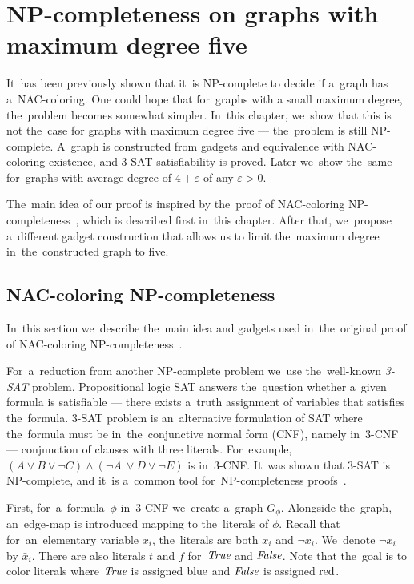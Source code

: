\chapter{NP-completeness on graphs with maximum degree five}%
\label{chapter:np}

\begin{chapterabstract}

	It~has been previously shown that it~is NP-complete to decide
	if a~graph has a~NAC-coloring.
	One could hope that for~graphs with a small maximum degree,
	the~problem becomes somewhat simpler.
	In~this chapter, we~show that this is not the~case
	for graphs with maximum degree five --- the~problem is still NP-complete.
	A~graph is constructed from gadgets and equivalence
	with NAC-coloring existence, and 3-SAT satisfiability is proved.
	Later we~show the~same for~graphs with average degree of
	$4+\varepsilon$ of any $\varepsilon > 0$.

\end{chapterabstract}

The~main idea of our proof is inspired by
the~proof of NAC-coloring NP-completeness~\cite{np_complete},
which is described first in~this chapter.
After that, we~propose a~different gadget construction
that allows us to limit the~maximum
degree in~the~constructed graph to five.

\section{NAC-coloring NP-completeness}

In~this section we~describe the~main idea and gadgets used
in~the~original proof of NAC-coloring NP-completeness~\cite{np_complete}.

For~a~reduction from another NP-complete problem
we~use the~well-known \emph{3-SAT} problem.
Propositional logic SAT answers the~question
whether a~given formula is satisfiable ---
there exists a~truth assignment of variables that satisfies the~formula.
3-SAT problem is an~alternative formulation of SAT
where the~formula must be in~the~conjunctive normal form (CNF), namely in~3-CNF
--- conjunction of clauses with three literals.
For~example, \( (A \lor B \lor \lnot C) \land (\lnot A~\lor D \lor \lnot E) \)
is in~3-CNF\@.
It~was shown that 3-SAT is NP-complete,
and it~is a~common tool for~NP-completeness proofs~\cite{3-sat}.

First, for~a~formula~\( \phi \) in~3-CNF we~create a~graph \( G_\phi \).
Alongside the~graph, an~edge-map is introduced mapping to the~literals
of \( \phi \). Recall that for~an~elementary variable \( x_i \), the~literals
are both \( x_i \) and \( \neg x_i \). We~denote \( \lnot x_i \) by \( \bar{x}_i \).
There are also literals \( t \) and \( f \) for~\( \textit{True} \) and \( \textit{False} \).
Note that the~goal is to color literals where \( \textit{True} \) is assigned \( \text{blue} \)
and \( \textit{False} \) is assigned \( \text{red} \).

